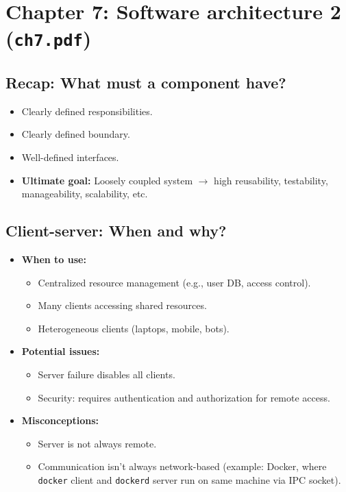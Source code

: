 \documentclass[11pt,a4paper]{article}
\begin{document}
\section{Chapter 7: Software architecture 2 (\texttt{ch7.pdf})}

\subsection*{Recap: What must a component have?}
\begin{itemize}
    \item Clearly defined responsibilities.
    \item Clearly defined boundary.
    \item Well-defined interfaces.
    \item \textbf{Ultimate goal:} Loosely coupled system $\rightarrow$ high reusability, testability, manageability, scalability, etc.
\end{itemize}

\subsection*{Client-server: When and why?}
\begin{itemize}
    \item \textbf{When to use:}
        \begin{itemize}
            \item Centralized resource management (e.g., user DB, access control).
            \item Many clients accessing shared resources.
            \item Heterogeneous clients (laptops, mobile, bots).
        \end{itemize}
    \item \textbf{Potential issues:}
        \begin{itemize}
            \item Server failure disables all clients.
            \item Security: requires authentication and authorization for remote access.
        \end{itemize}
    \item \textbf{Misconceptions:}
        \begin{itemize}
            \item Server is not always remote.
            \item Communication isn't always network-based (example: Docker, where \texttt{docker} client and \texttt{dockerd} server run on same machine via IPC socket).
        \end{itemize}
\end{itemize}
\end{document}
